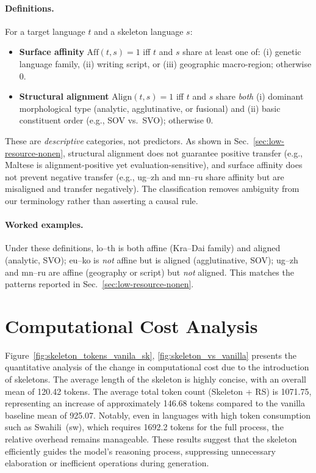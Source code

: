 \paragraph{Definitions.}
For a target language $t$ and a skeleton language $s$:
\begin{itemize}
\item \textbf{Surface affinity} $\mathrm{Aff}(t,s){=}1$ iff $t$ and $s$ share at least one of: (i) genetic language family, (ii) writing script, or (iii) geographic macro-region; otherwise $0$.
\item \textbf{Structural alignment} $\mathrm{Align}(t,s){=}1$ iff $t$ and $s$ share \emph{both} (i) dominant morphological type (analytic, agglutinative, or fusional) and (ii) basic constituent order (e.g., SOV vs.\ SVO); otherwise $0$.
\end{itemize}
These are \emph{descriptive} categories, not predictors. As shown in Sec.~\ref{sec:low-resource-nonen}, structural alignment does not guarantee positive transfer (e.g., Maltese is alignment-positive yet evaluation-sensitive), and surface affinity does not prevent negative transfer (e.g., ug--zh and mn--ru share affinity but are misaligned and transfer negatively). The classification removes ambiguity from our terminology rather than asserting a causal rule.

\paragraph{Worked examples.}
Under these definitions, lo--th is both affine (Kra--Dai family) and aligned (analytic, SVO); eu--ko is \emph{not} affine but is aligned (agglutinative, SOV); ug--zh and mn--ru are affine (geography or script) but \emph{not} aligned. This matches the patterns reported in Sec.~\ref{sec:low-resource-nonen}.

\section{Computational Cost Analysis}



Figure~\ref{fig:skeleton_tokens_vanila_sk}, \ref{fig:skeleton_vs_vanilla} presents the quantitative analysis of the change in computational cost due to the introduction of skeletons. The average length of the skeleton is highly concise, with an overall mean of 120.42 tokens. The average total token count (Skeleton + RS) is 1071.75, representing an increase of approximately 146.68 tokens compared to the vanilla baseline mean of 925.07. Notably, even in languages with high token consumption such as Swahili~(sw), which requires 1692.2 tokens for the full process, the relative overhead remains manageable. These results suggest that the skeleton efficiently guides the model's reasoning process, suppressing unnecessary elaboration or inefficient operations during generation.

